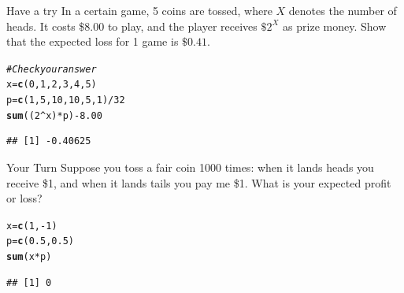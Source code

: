 \documentclass[t,xcolor=pdftex,dvipsnames,table]{beamer}
\makeatletter
\newcommand{\hlnum}[1]{\textcolor[rgb]{0.686,0.059,0.569}{#1}}%
\newcommand{\hlcom}[1]{\textcolor[rgb]{0.678,0.584,0.686}{\textit{#1}}}%
\newcommand{\hlopt}[1]{\textcolor[rgb]{0,0,0}{#1}}%
\newcommand{\hlstd}[1]{\textcolor[rgb]{0.345,0.345,0.345}{#1}}%
\newcommand{\hlkwb}[1]{\textcolor[rgb]{0.69,0.353,0.396}{#1}}%
\newcommand{\hlkwd}[1]{\textcolor[rgb]{0.737,0.353,0.396}{\textbf{#1}}}%
\newenvironment{kframe}{%
 \def\at@end@of@kframe{}%
 \ifinner\ifhmode%
  \def\at@end@of@kframe{\end{minipage}}%
  \begin{minipage}{\columnwidth}%
 \fi\fi%
 \def\FrameCommand##1{\hskip\@totalleftmargin \hskip-\fboxsep
 \colorbox{shadecolor}{##1}\hskip-\fboxsep
     \hskip-\linewidth \hskip-\@totalleftmargin \hskip\columnwidth}%
 \MakeFramed {\advance\hsize-\width
   \@totalleftmargin\z@ \linewidth\hsize
   \@setminipage}}%
 {\par\unskip\endMakeFramed%
 \at@end@of@kframe}
\newenvironment{knitrout}{}{} %
\makeatother
\begin{document}
\begin{frame}[fragile]\frametitle{}
\begin{alertblock}{Have a try}
In a certain game, 5 coins are tossed, where $X$ denotes the number of heads. It costs \$8.00 to play, and the player receives $\$ 2^X$ as prize money. Show that the expected loss for 1 game is $\$ 0.41$.
\end{alertblock}

\begin{knitrout}
\color{fgcolor}\begin{kframe}
\begin{alltt}
\hlcom{#Check your answer}
\hlstd{x}\hlkwb{=}\hlkwd{c}\hlstd{(}\hlnum{0}\hlstd{,}\hlnum{1}\hlstd{,}\hlnum{2}\hlstd{,}\hlnum{3}\hlstd{,}\hlnum{4}\hlstd{,}\hlnum{5}\hlstd{)}
\hlstd{p}\hlkwb{=}\hlkwd{c}\hlstd{(}\hlnum{1}\hlstd{,}\hlnum{5}\hlstd{,}\hlnum{10}\hlstd{,}\hlnum{10}\hlstd{,}\hlnum{5}\hlstd{,}\hlnum{1}\hlstd{)}\hlopt{/}\hlnum{32}
\hlkwd{sum}\hlstd{((}\hlnum{2}\hlopt{^}\hlstd{x)}\hlopt{*}\hlstd{p)}\hlopt{-}\hlnum{8.00}
\end{alltt}
\begin{verbatim}
## [1] -0.40625
\end{verbatim}
\end{kframe}
\end{knitrout}
\end{frame}


\begin{frame}[fragile]{}
\begin{alertblock}{Your Turn}
Suppose you toss a fair coin 1000 times:  when it lands heads
you receive \$1, and when it lands tails you pay me \$1.
What is your expected profit or loss?
\end{alertblock}


\begin{knitrout}
\color{fgcolor}\begin{kframe}
\begin{alltt}
\hlstd{x}\hlkwb{=}\hlkwd{c}\hlstd{(}\hlnum{1}\hlstd{,}\hlopt{-}\hlnum{1}\hlstd{)}
\hlstd{p}\hlkwb{=}\hlkwd{c}\hlstd{(}\hlnum{0.5}\hlstd{,}\hlnum{0.5}\hlstd{)}
\hlkwd{sum}\hlstd{(x}\hlopt{*}\hlstd{p)}
\end{alltt}
\begin{verbatim}
## [1] 0
\end{verbatim}
\end{kframe}
\end{knitrout}
\end{frame}
\end{document}
